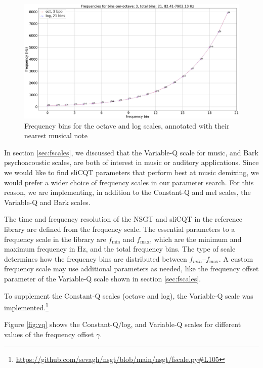 \documentclass[report.tex]{subfiles}
\begin{document}
\begin{figure}[ht]
	\centering
	\includegraphics[width=\textwidth]{./images-freqscales/log_vs_oct.png}
	\caption{Frequency bins for the octave and log scales, annotated with their nearest musical note}
	\label{fig:octvlog}
\end{figure}

In section \ref{sec:fscales}, we discussed that the Variable-Q scale for music, and Bark psychoacoustic scales, are both of interest in music or auditory applications. Since we would like to find sliCQT parameters that perform best at music demixing, we would prefer a wider choice of frequency scales in our parameter search. For this reason, we are implementing, in addition to the Constant-Q and mel scales, the Variable-Q and Bark scales.

The time and frequency resolution of the NSGT and sliCQT in the reference library are defined from the frequency scale. The essential parameters to a frequency scale in the library are $f_{\text{min}}$ and $f_{\text{max}}$, which are the minimum and maximum frequency in Hz, and the total frequency bins. The type of scale determines how the frequency bins are distributed between $f_{min}$--$f_{\text{max}}$. A custom frequency scale may use additional parameters as needed, like the frequency offset parameter of the Variable-Q scale shown in section \ref{sec:fscales}.

To supplement the Constant-Q scales (octave and log), the Variable-Q scale was implemented.\footnote{\url{https://github.com/sevagh/nsgt/blob/main/nsgt/fscale.py\#L105}}

Figure \ref{fig:vq} shows the Constant-Q/log, and Variable-Q scales for different values of the frequency offset $\gamma$.
\end{document}
